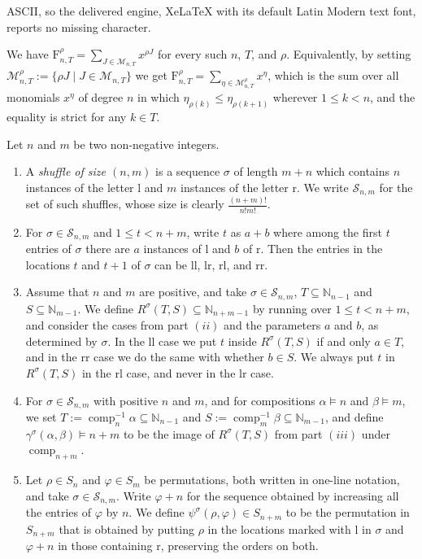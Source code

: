 \documentclass[10pt,a4paper]{amsart}
\begin{document}
ASCII, so the delivered engine, XeLaTeX with its default Latin Modern text font, reports no missing character.
\begin{lem}
We have $\mathrm{F}_{n,T}^{\rho}=\sum_{J\in\mathcal{M}_{n,T}}x^{\rho J}$ for every such $n$, $T$, and $\rho$. Equivalently, by setting $\mathcal{M}_{n,T}^{\rho}:=\{\rho J\;|\;J\in\mathcal{M}_{n,T}\}$ we get $\mathrm{F}_{n,T}^{\rho}=\sum_{\eta\in\mathcal{M}_{n,T}^{\rho}}x^{\eta}$, which is the sum over all monomials $x^{\eta}$ of degree $n$ in which $\eta_{\rho(k)}\leq\eta_{\rho(k+1)}$ wherever $1 \leq k<n$, and the equality is strict for any $k \in T$. \label{sumFnTNC}
\end{lem}

\begin{defn}
Let $n$ and $m$ be two non-negative integers.
\begin{enumerate}[$(i)$]
\item A \emph{shuffle of size $(n,m)$} is a sequence $\sigma$ of length $m+n$ which contains $n$ instances of the letter l and $m$ instances of the letter r. We write $\mathcal{S}_{n,m}$ for the set of such shuffles, whose size is clearly $\frac{(n+m)!}{n!m!}$.
\item For $\sigma\in\mathcal{S}_{n,m}$ and $1 \leq t<n+m$, write $t$ as $a+b$ where among the first $t$ entries of $\sigma$ there are $a$ instances of l and $b$ of r. Then the entries in the locations $t$ and $t+1$ of $\sigma$ can be ll, lr, rl, and rr.
\item Assume that $n$ and $m$ are positive, and take $\sigma\in\mathcal{S}_{n,m}$, $T\subseteq\mathbb{N}_{n-1}$ and $S\subseteq\mathbb{N}_{m-1}$. We define $R^{\sigma}(T,S)\subseteq\mathbb{N}_{n+m-1}$ by running over $1 \leq t<n+m$, and consider the cases from part $(ii)$ and the parameters $a$ and $b$, as determined by $\sigma$. In the ll case we put $t$ inside $R^{\sigma}(T,S)$ if and only $a \in T$, and in the rr case we do the same with whether $b \in S$. We always put $t$ in $R^{\sigma}(T,S)$ in the rl case, and never in the lr case.
\item For $\sigma\in\mathcal{S}_{n,m}$ with positive $n$ and $m$, and for compositions $\alpha \vDash n$ and $\beta \vDash m$, we set $T:=\operatorname{comp}_{n}^{-1}\alpha\subseteq\mathbb{N}_{n-1}$ and $S:=\operatorname{comp}_{m}^{-1}\beta\subseteq\mathbb{N}_{m-1}$, and define $\gamma^{\sigma}(\alpha,\beta) \vDash n+m$ to be the image of $R^{\sigma}(T,S)$ from part $(iii)$ under
    $\operatorname{comp}_{n+m}$.
\item Let $\rho \in S_{n}$ and $\varphi \in S_{m}$ be permutations, both written in one-line notation, and take $\sigma\in\mathcal{S}_{n,m}$. Write $\varphi+n$ for the sequence obtained by increasing all the entries of $\varphi$ by $n$. We define $\psi^{\sigma}(\rho,\varphi) \in S_{n+m}$ to be the permutation in $S_{n+m}$ that is obtained by putting $\rho$ in the locations marked with l in $\sigma$ and $\varphi+n$ in those containing r, preserving the orders on both.
\end{enumerate} \label{shuffle}
\end{defn}
\end{document}

